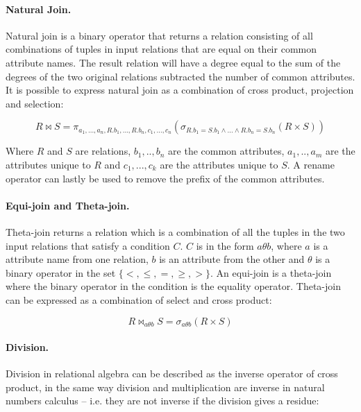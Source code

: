 \paragraph{Natural Join.}
Natural join is a binary operator that returns a relation consisting of all combinations of tuples in input
relations that are equal on their common attribute names. The result relation will have a degree equal to the sum
of the degrees of the two original relations subtracted the number of common attributes. It is possible to express
natural join as a combination of cross product, projection and selection:

\begin{equation*}
R \bowtie S = \pi_{a_{1},..., a_{n},R.b_{1},...,R.b_{n},c_{1},...,c_{n}}( \sigma _{R.b_{1}=S.b_{1} \wedge ... \wedge R.b_{n}=S.b_{n}}(R \times S))
\end{equation*}

Where $R$ and $S$ are relations, $b_{1},..,b_{n}$ are the common attributes, $a_{1},..,a_{m}$ are the attributes
unique to $R$ and $c_{1},...,c_{k}$ are the attributes unique to $S$. A rename operator can lastly be used to
remove the prefix of the common attributes.

\paragraph{Equi-join and Theta-join.}
Theta-join returns a relation which is a combination of all the tuples in the two input relations that satisfy a
condition $C$. $C$ is in the form $a \theta b$, where $a$ is a attribute name from one relation, $b$ is an
attribute from the other and $ \theta $ is a binary operator in the set $ \{ <, \leq , =, \geq , >  \} $. An
equi-join is a theta-join where the binary operator in the condition is the equality operator. Theta-join can be
expressed as a combination of select and cross product:

\begin{equation*}
R \bowtie _{a \theta b}S = \sigma _{a \theta b}(R \times S)
\end{equation*}

\paragraph{Division.}
Division in relational algebra can be described as the inverse operator of cross product, in the same way division
and multiplication are inverse in natural numbers calculus -- i.e. they are not inverse if the division gives a
residue:

